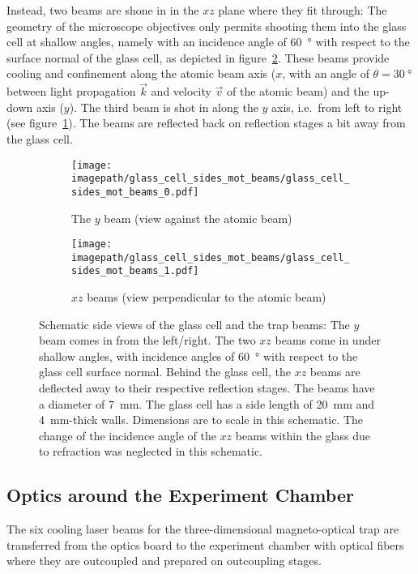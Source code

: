 Instead, two beams are shone in in the $xz$ plane where they fit through: The geometry of the microscope objectives only permits shooting them into the glass cell at shallow angles, namely with an incidence angle of \SI{60}{\degree} with respect to the surface normal of the glass cell, as depicted in figure~\ref{fig:glass_cell_sides_mot_beams_0}. These beams provide cooling and confinement along the atomic beam axis ($x$, with an angle of $\theta = \SI{30}{\degree}$ between light propagation $\vec k$ and velocity $\vec v$ of the atomic beam) and the up-down axis ($y$). The third beam is shot in along the $y$ axis, i.e.\ from left to right (see figure~\ref{fig:glass_cell_sides_mot_beams_1}). The beams are reflected back on reflection stages a bit away from the glass cell.

\begin{figure}
    \centering
    \begin{subfigure}[t]{0.26\textwidth}
        \centering
        \texttt{[image: \\imagepath/glass\_cell\_sides\_mot\_beams/glass\_cell\_sides\_mot\_beams\_0.pdf]}
        \caption{The $y$ beam (view against the atomic beam)}\label{fig:glass_cell_sides_mot_beams_1}
    \end{subfigure}
    \hspace{0.07\textwidth}
    \begin{subfigure}[t]{0.66\textwidth}
        \centering
        \texttt{[image: \\imagepath/glass\_cell\_sides\_mot\_beams/glass\_cell\_sides\_mot\_beams\_1.pdf]}
        \caption{$xz$ beams (view perpendicular to the atomic beam)}\label{fig:glass_cell_sides_mot_beams_0}
    \end{subfigure}
    \caption{Schematic side views of the glass cell and the trap beams: The $y$ beam comes in from the left/right. The two $xz$ beams come in under shallow angles, with incidence angles of \SI{60}{\degree} with respect to the glass cell surface normal. Behind the glass cell, the $xz$ beams are deflected away to their respective reflection stages. The beams have a diameter of \SI{7}{\milli\meter}. The glass cell has a side length of \SI{20}{\milli\meter} and \SI{4}{\milli\meter}-thick walls. Dimensions are to scale in this schematic. The change of the incidence angle of the $xz$ beams within the glass due to refraction was neglected in this schematic.}
    \label{fig:glass_cell_sides_mot_beams}
\end{figure} 

\subsection*{Optics around the Experiment Chamber}
The six cooling laser beams for the three-dimensional magneto-optical trap are transferred from the optics board to the experiment chamber with optical fibers where they are outcoupled and prepared on outcoupling stages. 

